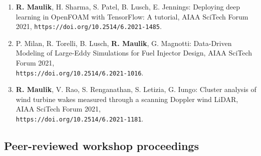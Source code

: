 \documentclass[letterpaper]{article}
\begin{document}
\begin{enumerate}

\item \textbf{R. Maulik}, H. Sharma, S. Patel, B. Lusch, E. Jennings: Deploying deep learning in OpenFOAM with TensorFlow: A tutorial, AIAA SciTech Forum 2021, \texttt{https://doi.org/10.2514/6.2021-1485}.

\item P. Milan, R. Torelli, B. Lusch, \textbf{R. Maulik}, G. Magnotti: Data-Driven Modeling of Large-Eddy Simulations for Fuel Injector Design, AIAA SciTech Forum 2021, \\ \texttt{https://doi.org/10.2514/6.2021-1016}.

\item \textbf{R. Maulik}, V. Rao, S. Renganathan, S. Letizia, G. Iungo: Cluster analysis of wind turbine wakes measured through a scanning Doppler wind LiDAR, AIAA SciTech Forum 2021, \\ \texttt{https://doi.org/10.2514/6.2021-1181}.

\end{enumerate}

\subsection*{Peer-reviewed workshop proceedings}
\end{document}
